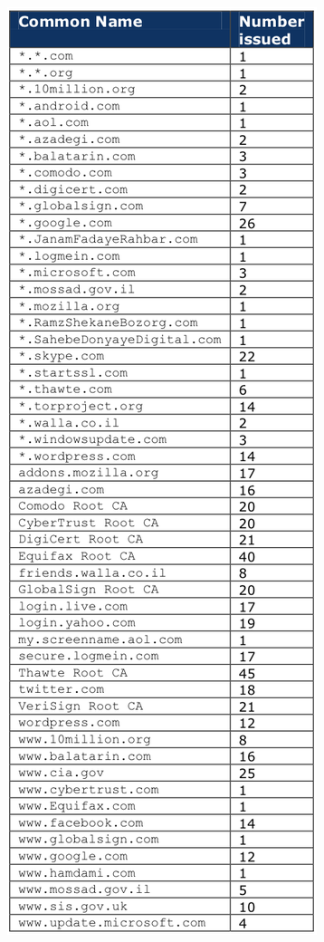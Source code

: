 \documentclass{beamer}
\begin{document}
\begin{frame}
\begin{minipage}[t]{0.23\textwidth}
\begin{figure}[H]
		\includegraphics[scale=0.285]{rogue}
	\end{figure}
\end{minipage}
\end{frame}
\end{document}
